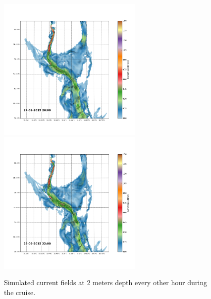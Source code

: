 \documentclass[12pt,a4paper,english]{article}
\begin{document}
\begin{figure}[h]
{}
\centerline{
\includegraphics*[trim=2.0cm 3cm 6.0cm 3.5cm,clip=true,height=7cm]{Python/stromfelt_42}
\includegraphics*[trim=3.7cm 3cm 1.3cm 3.5cm,clip=true,height=7cm]{Python/stromfelt_44}
}
\caption{\small
Simulated current fields at 2 meters depth every other hour during the cruise.}
\label{fig:Current3}
\end{figure}
\end{document}
